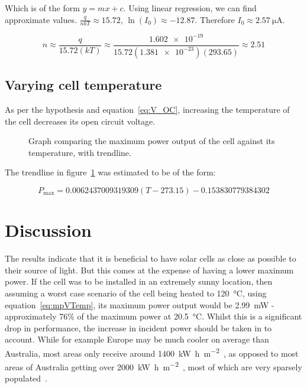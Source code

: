 \documentclass[a4paper,11pt]{article}
\begin{document}
Which is of the form $y = mx + c$. Using linear regression, we can find approximate values. $\frac{q}{nkT} \approx 15.72$, $\ln{(I_0)} \approx -12.87$. Therefore $I_0 \approx \SI{2.57}{\micro\ampere}$.

\begin{displaymath}
n \approx \frac{q}{15.72(kT)} \approx \frac{\num{1.602e-19}}{15.72(\num{1.381e-23})(293.65)} \approx 2.51
\end{displaymath}

\subsection{Varying cell temperature}
As per the hypothesis and equation~\ref{eq:V_OC}, increasing the temperature of the cell decreases its open circuit voltage.

\begin{figure}[h]
\centering
{}
\caption{Graph comparing the maximum power output of the cell against its temperature, with trendline.}
\label{plot:tempPower}
\end{figure}

The trendline in figure~\ref{plot:tempPower} was estimated to be of the form:

\begin{equation} \label{eq:mpVTemp}
P_{\textrm{max}} = 0.0062437009319309(T-273.15)-0.153830779384302
\end{equation}


\section{Discussion}
The results indicate that it is beneficial to have solar cells as close as possible to their source of light. But this comes at the expense of having a lower maximum power. If the cell was to be installed in an extremely sunny location, then assuming a worst case scenario of the cell being heated to \SI{120}{\celsius}, using equation~\ref{eq:mpVTemp}, its maximum power output would be \SI{2.99}{\milli\watt} - approximately 76\% of the maximum power at \SI{20.5}{\celsius}. Whilst this is a significant drop in performance, the increase in incident power should be taken in to account. While for example Europe may be much cooler on average than Australia, most areas only receive around \SI{1400}{\kilo\watt\hour\per\metre\squared}~\cite{solarMapEur}, as opposed to most areas of Australia getting over \SI{2000}{\kilo\watt\hour\per\metre\squared}~\cite{solarMapAus}, most of which are very sparsely populated~\cite{ausPopulationMap}.
\end{document}
